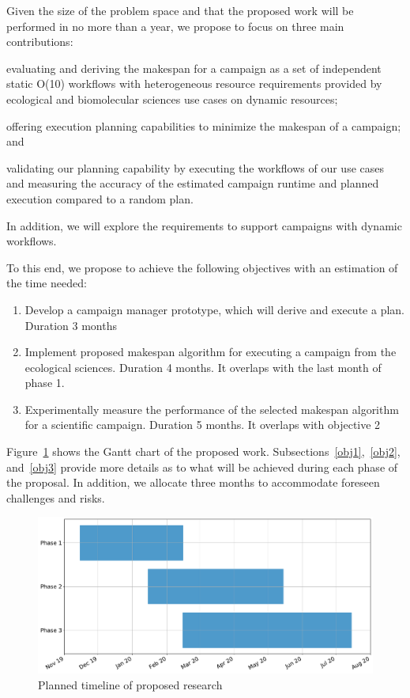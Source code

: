 \label{timeline}
Given the size of the problem space and that the proposed work will be performed in no more than a year, we propose to focus on three main contributions:
\begin{inparaenum}[(1)]
\item evaluating and deriving the makespan for a campaign as a set of independent static O(10) workflows with heterogeneous resource requirements provided by ecological and biomolecular sciences use cases on dynamic resources; 
\item offering execution planning capabilities to minimize the makespan of a campaign; and 
\item validating our planning capability by executing the workflows of our use cases and measuring the accuracy of the estimated campaign runtime and planned execution compared to a random plan.
\end{inparaenum}
In addition, we will explore the requirements to support campaigns with dynamic workflows.

To this end, we propose to achieve the following objectives with an estimation of the time needed:
\begin{enumerate}
    \item Develop a campaign manager prototype, which will derive and execute a plan. Duration 3 months
    \item Implement proposed makespan algorithm for executing a campaign from the ecological sciences. Duration 4 months. It overlaps with the last month of phase 1.
    \item Experimentally measure the performance of the selected makespan algorithm for a scientific campaign. Duration 5 months. It overlaps with objective 2 
\end{enumerate}
Figure~\ref{fig:work_plan} shows the Gantt chart of the proposed work.
Subsections~\ref{obj1},~\ref{obj2}, and~\ref{obj3} provide more details as to what will be achieved during each phase of the proposal.
In addition, we allocate three months to accommodate foreseen challenges and risks.
\begin{figure}[t]
	\centering
	\includegraphics[width=.95\textwidth]{figures/phd_plan.pdf}
	\caption{Planned timeline of proposed research}\label{fig:work_plan}
\end{figure}

